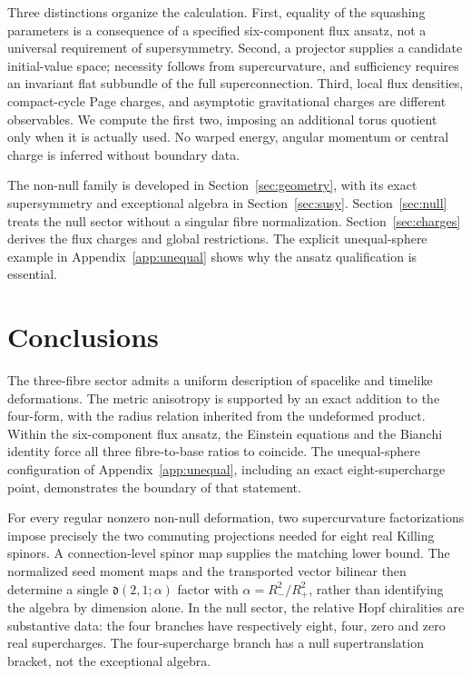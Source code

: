 \documentclass[11pt,a4paper]{article}
\numberwithin{equation}{section}
\begin{document}
Three distinctions organize the calculation. First, equality of the squashing parameters is a consequence of a specified six-component flux ansatz, not a universal requirement of supersymmetry. Second, a projector supplies a candidate initial-value space; necessity follows from supercurvature, and sufficiency requires an invariant flat subbundle of the full superconnection. Third, local flux densities, compact-cycle Page charges, and asymptotic gravitational charges are different observables. We compute the first two, imposing an additional torus quotient only when it is actually used. No warped energy, angular momentum or central charge is inferred without boundary data.

The non-null family is developed in Section~\ref{sec:geometry}, with its exact supersymmetry and exceptional algebra in Section~\ref{sec:susy}. Section~\ref{sec:null} treats the null sector without a singular fibre normalization. Section~\ref{sec:charges} derives the flux charges and global restrictions. The explicit unequal-sphere example in Appendix~\ref{app:unequal} shows why the ansatz qualification is essential.






\section{Conclusions}
The three-fibre sector admits a uniform description of spacelike and timelike deformations. The metric anisotropy is supported by an exact addition to the four-form, with the radius relation inherited from the undeformed product. Within the six-component flux ansatz, the Einstein equations and the Bianchi identity force all three fibre-to-base ratios to coincide. The unequal-sphere configuration of Appendix~\ref{app:unequal}, including an exact eight-supercharge point, demonstrates the boundary of that statement.

For every regular nonzero non-null deformation, two supercurvature factorizations impose precisely the two commuting projections needed for eight real Killing spinors. A connection-level spinor map supplies the matching lower bound. The normalized seed moment maps and the transported vector bilinear then determine a single $\mathfrak d(2,1;\alpha)$ factor with $\alpha=R_-^2/R_+^2$, rather than identifying the algebra by dimension alone. In the null sector, the relative Hopf chiralities are substantive data: the four branches have respectively eight, four, zero and zero real supercharges. The four-supercharge branch has a null supertranslation bracket, not the exceptional algebra.
\end{document}
